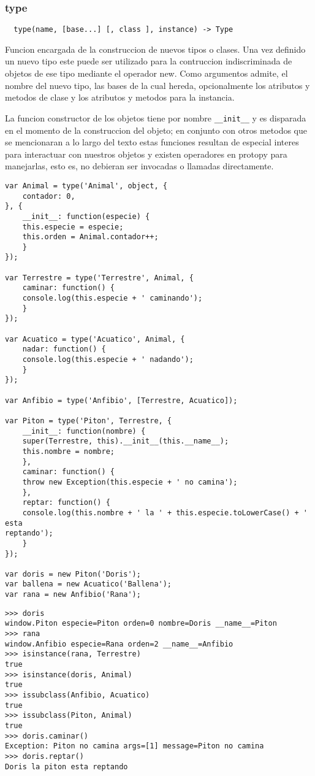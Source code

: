 \subsubsection*{type}
\begin{verbatim}
  type(name, [base...] [, class ], instance) -> Type
\end{verbatim} 
Funcion encargada de la construccion de nuevos tipos o clases.
Una vez definido un nuevo tipo este puede ser utilizado para la contruccion
indiscriminada de objetos de ese tipo mediante el operador new.
Como argumentos admite, el nombre del nuevo tipo, las bases de la cual hereda,
opcionalmente los atributos y metodos de clase y los atributos y metodos para la
instancia.

La funcion constructor de los objetos tiene por nombre \verb|__init__| y es disparada
en el momento de la construccion del objeto; en conjunto con otros metodos que
se mencionaran a lo largo del texto estas funciones resultan de especial interes
para interactuar con nuestros objetos y existen operadores en protopy para
manejarlas, esto es, no debieran ser invocadas o llamadas directamente.
\begin{lstlisting}[style=javascript,label=definicion-de-tipos,caption=Definicion de tipos]
var Animal = type('Animal', object, {
    contador: 0,
}, {
    __init__: function(especie) {
	this.especie = especie;
	this.orden = Animal.contador++;
    }
});

var Terrestre = type('Terrestre', Animal, {
    caminar: function() {
	console.log(this.especie + ' caminando');
    }
});

var Acuatico = type('Acuatico', Animal, {
    nadar: function() {
	console.log(this.especie + ' nadando');
    }
});

var Anfibio = type('Anfibio', [Terrestre, Acuatico]);

var Piton = type('Piton', Terrestre, {
    __init__: function(nombre) {
	super(Terrestre, this).__init__(this.__name__);
	this.nombre = nombre;
    },
    caminar: function() {
	throw new Exception(this.especie + ' no camina');
    },
    reptar: function() {
	console.log(this.nombre + ' la ' + this.especie.toLowerCase() + ' esta
reptando');
    }
});

var doris = new Piton('Doris');
var ballena = new Acuatico('Ballena');
var rana = new Anfibio('Rana');
\end{lstlisting}
\begin{lstlisting}[style=consola]
>>> doris
window.Piton especie=Piton orden=0 nombre=Doris __name__=Piton
>>> rana
window.Anfibio especie=Rana orden=2 __name__=Anfibio
>>> isinstance(rana, Terrestre)
true
>>> isinstance(doris, Animal)
true
>>> issubclass(Anfibio, Acuatico)
true
>>> issubclass(Piton, Animal)
true
>>> doris.caminar()
Exception: Piton no camina args=[1] message=Piton no camina
>>> doris.reptar()
Doris la piton esta reptando
\end{lstlisting}

